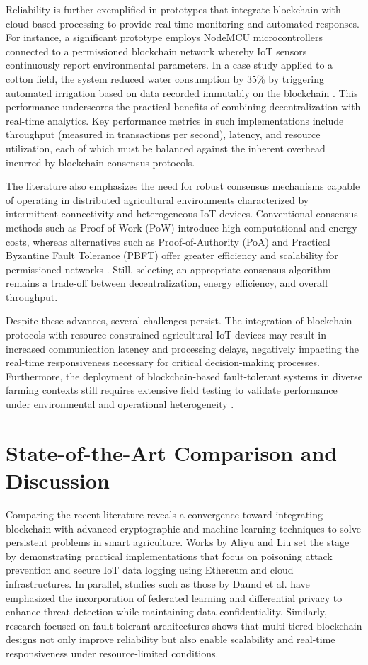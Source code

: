 \documentclass[12pt,onecolumn]{IEEEtran} %
\begin{document}
Reliability is further exemplified in prototypes that integrate blockchain with cloud-based processing to provide real-time monitoring and automated responses. For instance, a significant prototype employs NodeMCU microcontrollers connected to a permissioned blockchain network whereby IoT sensors continuously report environmental parameters. In a case study applied to a cotton field, the system reduced water consumption by 35\% by triggering automated irrigation based on data recorded immutably on the blockchain \cite{shahzad2025decentralizediotbasedarchitectures}. This performance underscores the practical benefits of combining decentralization with real-time analytics. Key performance metrics in such implementations include throughput (measured in transactions per second), latency, and resource utilization, each of which must be balanced against the inherent overhead incurred by blockchain consensus protocols.

The literature also emphasizes the need for robust consensus mechanisms capable of operating in distributed agricultural environments characterized by intermittent connectivity and heterogeneous IoT devices. Conventional consensus methods such as Proof-of-Work (PoW) introduce high computational and energy costs, whereas alternatives such as Proof-of-Authority (PoA) and Practical Byzantine Fault Tolerance (PBFT) offer greater efficiency and scalability for permissioned networks \cite{soy2025blockchainintegrationin}. Still, selecting an appropriate consensus algorithm remains a trade-off between decentralization, energy efficiency, and overall throughput.

Despite these advances, several challenges persist. The integration of blockchain protocols with resource-constrained agricultural IoT devices may result in increased communication latency and processing delays, negatively impacting the real-time responsiveness necessary for critical decision-making processes. Furthermore, the deployment of blockchain-based fault-tolerant systems in diverse farming contexts still requires extensive field testing to validate performance under environmental and operational heterogeneity \cite{shahzad2025decentralizediotbasedarchitectures}.

\section{State-of-the-Art Comparison and Discussion}
Comparing the recent literature reveals a convergence toward integrating blockchain with advanced cryptographic and machine learning techniques to solve persistent problems in smart agriculture. Works by Aliyu and Liu set the stage by demonstrating practical implementations that focus on poisoning attack prevention and secure IoT data logging using Ethereum and cloud infrastructures. In parallel, studies such as those by Daund et al. have emphasized the incorporation of federated learning and differential privacy to enhance threat detection while maintaining data confidentiality. Similarly, research focused on fault-tolerant architectures shows that multi-tiered blockchain designs not only improve reliability but also enable scalability and real-time responsiveness under resource-limited conditions.
\end{document}
